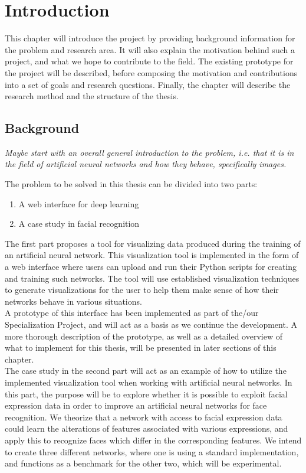 \chapter{Introduction}

This chapter will introduce the project by providing background information for the problem and research area. It will also explain the motivation behind such a project, and what we hope to contribute to the field. The existing prototype for the project will be described, before composing the motivation and contributions into a set of goals and research questions. Finally, the chapter will describe the research method and the structure of the thesis.

\section{Background}

\textit{Maybe start with an overall general introduction to the problem, i.e. that it is in the field of artificial neural networks and how they behave, specifically images.}

\noindent The problem to be solved in this thesis can be divided into two parts:
\begin{enumerate}
    \item A web interface for deep learning
    \item A case study in facial recognition
\end{enumerate}

\noindent The first part proposes a tool for visualizing data produced during the training of an artificial neural network. This visualization tool is implemented in the form of a web interface where users can upload and run their Python scripts for creating and training such networks. The tool will use established visualization techniques to generate visualizations for the user to help them make sense of how their networks behave in various situations. \\

\noindent A prototype of this interface has been implemented as part of the/our Specialization Project, and will act as a basis as we continue the development. A more thorough description of the prototype, as well as a detailed overview of what to implement for this thesis, will be presented in later sections of this chapter. \\

\noindent The case study in the second part will act as an example of how to utilize the implemented visualization tool when working with artificial neural networks. In this part, the purpose will be to explore whether it is possible to exploit facial expression data in order to improve an artificial neural networks for face recognition. We theorize that a network with access to facial expression data could learn the alterations of features associated with various expressions, and apply this to recognize faces which differ in the corresponding features. We intend to create three different networks, where one is using a standard implementation, and functions as a benchmark for the other two, which will be experimental.

